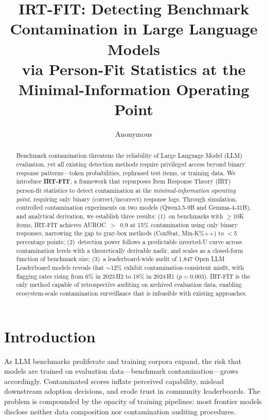 \documentclass[11pt,a4paper]{article}
\title{IRT-FIT: Detecting Benchmark Contamination in Large Language Models\\via Person-Fit Statistics at the Minimal-Information Operating Point}
\author{Anonymous}
\date{}
\begin{document}
\maketitle

\begin{abstract}
Benchmark contamination threatens the reliability of Large Language Model (LLM) evaluation, yet all existing detection methods require privileged access beyond binary response patterns---token probabilities, rephrased test items, or training data.
We introduce \textbf{IRT-FIT}, a framework that repurposes Item Response Theory (IRT) person-fit statistics to detect contamination at the \emph{minimal-information operating point}, requiring only binary (correct/incorrect) response logs.
Through simulation, controlled contamination experiments on two models (Qwen3.5-9B and Gemma-4-31B), and analytical derivation, we establish three results:
(1)~on benchmarks with $\geq$10K items, IRT-FIT achieves AUROC~$>$~0.9 at 15\% contamination using only binary responses, narrowing the gap to gray-box methods (ConStat, Min-K\%++) to $<$5 percentage points;
(2)~detection power follows a predictable inverted-U curve across contamination levels with a theoretically derivable nadir, and scales as a closed-form function of benchmark size;
(3)~a leaderboard-wide audit of 1{,}847 Open LLM Leaderboard models reveals that ${\sim}$12\% exhibit contamination-consistent misfit, with flagging rates rising from 6\% in 2023\,H2 to 18\% in 2024\,H1 ($p{=}0.003$).
IRT-FIT is the only method capable of retrospective auditing on archived evaluation data, enabling ecosystem-scale contamination surveillance that is infeasible with existing approaches.
\end{abstract}

\section{Introduction}

As LLM benchmarks proliferate and training corpora expand, the risk that models are trained on evaluation data---benchmark contamination---grows accordingly.
Contaminated scores inflate perceived capability, mislead downstream adoption decisions, and erode trust in community leaderboards.
The problem is compounded by the opacity of training pipelines: most frontier models disclose neither data composition nor contamination auditing procedures.
\end{document}
